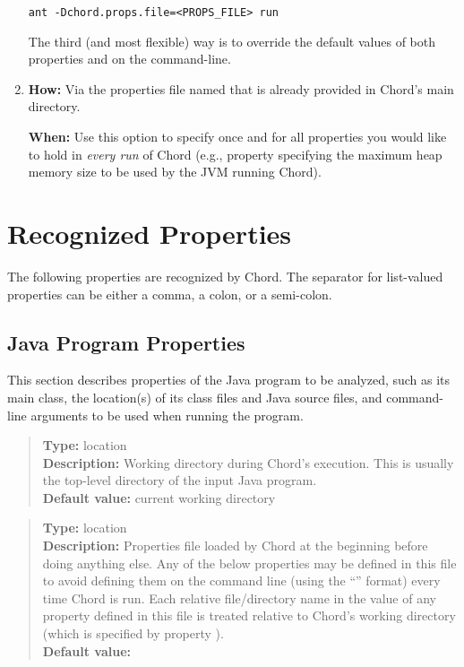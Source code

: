 \begin{enumerate}
\begin{framed}
\begin{verbatim}
ant -Dchord.props.file=<PROPS_FILE> run
\end{verbatim}
\end{framed}

The third (and most flexible) way is to override the default values of both properties 
and  on the command-line.


\item

{\bf How:} Via the properties file named  that is already provided in Chord's main directory.

{\bf When:} Use this option to specify once and for all properties you would
like to hold in {\it every run} of Chord (e.g., property 
specifying the maximum heap memory size to be used by the JVM running Chord).
\end{enumerate}

\section{Recognized Properties}
\label{sec:properties-meaning}

The following properties are recognized by Chord.
The separator for list-valued properties can be either a comma, a colon, or a semi-colon.

\subsection{Java Program Properties} 
\label{sec:program-props}

This section describes properties of the Java program to be analyzed, such as
its main class, the location(s) of its class files and Java source
files, and command-line arguments to be used when running the program.

\begin{quote}
{\bf Type:} location \\
{\bf Description:} Working directory during Chord's execution.  This is
usually the top-level directory of the input Java program. \\
{\bf Default value:} current working directory
\end{quote}

\begin{quote}
{\bf Type:} location \\
{\bf Description:} Properties file loaded by Chord at the
beginning before doing anything else.  Any of the below properties may
be defined in this file to avoid defining them on the command line
(using the ``'' format) every time Chord is run.
Each relative file/directory name in the value of any property defined
in this file is treated relative to Chord's working directory (which
is specified by property ). \\
{\bf Default value:} 
\end{quote}

